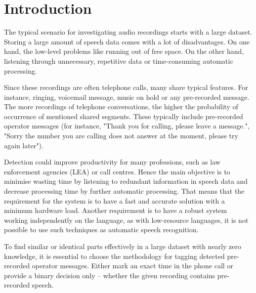 \documentclass{ExcelAtFIT}
\affiliation{*%
  \href{mailto:xbobos00@stud.fit.vutbr.cz}{xbobos00@stud.fit.vutbr.cz},
  \textit{Faculty of Information Technology, Brno University of Technology}}
\begin{document}
\startdocument



\section{Introduction}
The typical scenario for investigating audio recordings starts with a large dataset. Storing a large amount of speech data comes with a lot of disadvantages. On one hand, the low-level problems like running out of free space. On the other hand, listening through unnecessary, repetitive data or time-consuming automatic processing.

Since these recordings are often telephone calls, many share typical features. For instance, ringing, voicemail message, music on hold or any pre-recorded message. The more recordings of telephone conversations, the higher the probability of occurrence of mentioned shared segments. These typically include pre-recorded operator messages (for instance, "Thank you for calling, please leave a message.", "Sorry the number you are calling does not answer at the moment, please try again later"). 

Detection could improve productivity for many professions, such as law enforcement agencies (LEA) or call centres. Hence the main objective is to minimise wasting time by listening to redundant information in speech data and decrease processing time by further automatic processing. That means that the requirement for the system is to have a fast and accurate solution with a minimum hardware load. Another requirement is to have a robust system working independently on the language, as with low-resource languages, it is not possible to use such techniques as automatic speech recognition. 

To find similar or identical parts effectively in a large dataset with nearly zero knowledge, it is essential to choose the methodology for tagging detected pre-recorded operator messages. Either mark an exact time in the phone call or provide a binary decision only -- whether the given recording contains pre-recorded speech.    
\end{document}
